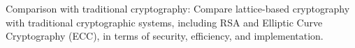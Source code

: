 Comparison with traditional cryptography: Compare lattice-based cryptography with traditional cryptographic systems, including RSA and Elliptic Curve Cryptography (ECC), in terms of security, efficiency, and implementation.
